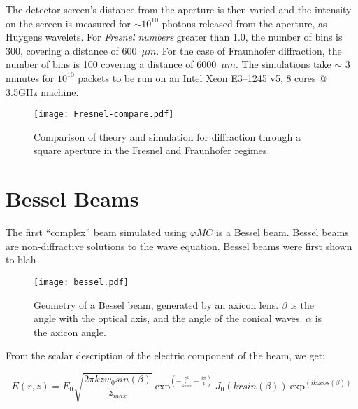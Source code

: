 The detector screen's distance from the aperture is then varied and the intensity on the screen is measured for $\sim 10^{10}$ photons released from the aperture, as Huygens wavelets.
For \textit{Fresnel numbers} greater than 1.0, the number of bins is 300, covering a distance of 600~$\mu m$. 
For the case of Fraunhofer diffraction, the number of bins is 100 covering a distance of 6000~$\mu m$.
The simulations take $\sim$ 3 minutes for $10^10$ packets to be run on an Intel Xeon E3--1245 v5, 8 cores @ 3.5GHz machine.

\begin{figure}[!ht]
    \centering
    \texttt{[image: Fresnel-compare.pdf]}
    \caption{Comparison of theory and simulation for diffraction through a square aperture in the Fresnel and Fraunhofer regimes.}
    \label{fig:frescompare}
\end{figure}

\FloatBarrier

\section{Bessel Beams}

The first ``complex'' beam simulated using $\varphi MC$ is a Bessel beam. 
Bessel beams are non-diffractive solutions to the wave equation. 
Bessel beams were first shown to blah




\begin{figure}[!ht]
    \centering
    \texttt{[image: bessel.pdf]}
    \caption{Geometry of a Bessel beam, generated by an axicon lens. $\beta$ is the angle with the optical axis, and the angle of the conical waves. $\alpha$ is the axicon angle.}
    \label{fig:besselgeo}
\end{figure}

From the scalar description of the electric component of the beam, we get:

\begin{equation}
    E(r,z)=E_0\sqrt{\frac{2\pi k z w_0sin(\beta)}{z_{max}}}\ \text{exp}^{\left(-\frac{z^2}{z_{max}^2}-\frac{i\pi}{4}\right)}\ J_0\left(krsin(\beta)\right)\ \text{exp}^{\left(ikzcos(\beta)\right)}
    \label{eqn:besselEfield}
\end{equation}

